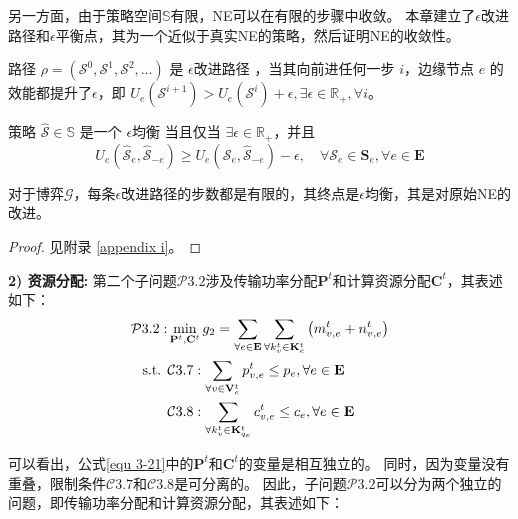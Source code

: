 \noindent 另一方面，由于策略空间$\mathbb{S}$有限，NE可以在有限的步骤中收敛。
本章建立了$\epsilon$改进路径和$\epsilon$平衡点\cite{chew2016potential}，其为一个近似于真实NE的策略，然后证明NE的收敛性。
\begin{definition} 
	路径 $\rho=\left(\mathcal{S}^{0}, \mathcal{S}^{1}, \mathcal{S}^{2}, \ldots\right)$ 是 $\epsilon$改进路径 \cite{chew2016potential}，当其向前进任何一步 $i$，边缘节点 $e$ 的效能都提升了$\epsilon$，即 $U_{e}\left(\mathcal{S}^{i+1}\right) > U_{e}\left(\mathcal{S}^{i}\right) + \epsilon, \exists \epsilon \in \mathbb{R}_{+}, \forall i$。
\end{definition}
\begin{definition}
	策略 $\mathcal{\hat{S}} \in \mathbb{S}$ 是一个 $\epsilon$均衡 \cite{chew2016potential} 当且仅当 $\exists \epsilon \in \mathbb{R}_{+}$，并且
	\begin{equation}
		U_{e}\left(\mathcal{\hat{S}}_{e}, \mathcal{\hat{S}}_{-e}\right) \geq U_{e}\left(\mathcal{S}_{e}, \mathcal{\hat{S}}_{-e}\right) - \epsilon, \quad \forall \mathcal{S}_{e} \in \mathbf{S}_{e}, \forall e \in \mathbf{E}
	\end{equation}
\end{definition}
\begin{theorem}
对于博弈$\mathcal{G}$，每条$\epsilon$改进路径的步数都是有限的，其终点是$\epsilon$均衡，其是对原始NE的改进。
\label{theorem 4-3}
\end{theorem}
\begin{proof} 见附录 \ref{appendix i}。
\end{proof}

\textbf{2) 资源分配:} 第二个子问题$\mathcal{P}3.2$涉及传输功率分配$\mathbf{P}^{t}$和计算资源分配$\mathbf{C}^{t}$，其表述如下：
\begin{align}
	\mathcal{P}3.2: &\min_{\mathbf{P}^{t}, \mathbf{C}^{t}} g_2= \sum_{ \forall e \in \mathbf{E}} \sum_{\forall k_{v}^{t} \in \mathbf{K}_{e}^{t}} \left( m_{v, e}^{t} +  n_{v, e}^{t} \right) \notag \\
	\text { s.t. }
    &\mathcal{C}3.7: \sum_{\forall v \in \mathbf{V}_{e}^{t}} p_{v, e}^{t} \leq p_{e}, \forall e \in \mathbf{E} \notag \\
    &\mathcal{C}3.8: \sum_{\forall k_{v}^{t} \in {\mathbf{K}_{q_e}^{t} }} c_{v, e}^t \leq c_{e}, \forall e \in \mathbf{E}
\label{equ 3-21}
\end{align}

\noindent 可以看出，公式\ref{equ 3-21}中的$\mathbf{P}^{t}$和$\mathbf{C}^{t}$的变量是相互独立的。
同时，因为变量没有重叠，限制条件$\mathcal{C}3.7$和$\mathcal{C}3.8$是可分离的。
因此，子问题$\mathcal{P}3.2$可以分为两个独立的问题，即传输功率分配和计算资源分配，其表述如下：


